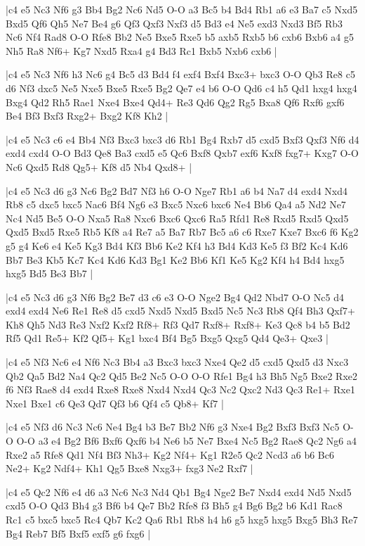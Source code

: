 \whitename{}
\blackname{}
\makegametitle
|c4 e5 Nc3 Nf6 g3 Bb4 Bg2 Nc6 Nd5 O-O a3 Bc5 b4 Bd4 Rb1 a6 e3 Ba7 c5 Nxd5 Bxd5 Qf6 Qh5 Ne7 Be4 g6 Qf3 Qxf3 Nxf3 d5 Bd3 e4 Ne5 exd3 Nxd3 Bf5 Rb3 Nc6 Nf4 Rad8 O-O Rfe8 Bb2 Ne5 Bxe5 Rxe5 b5 axb5 Rxb5 b6 cxb6 Bxb6 a4 g5 Nh5 Ra8 Nf6+ Kg7 Nxd5 Rxa4 g4 Bd3 Rc1 Bxb5 Nxb6 cxb6  |

\whitename{}
\blackname{}
\makegametitle
|c4 e5 Nc3 Nf6 h3 Nc6 g4 Bc5 d3 Bd4 f4 exf4 Bxf4 Bxc3+ bxc3 O-O Qb3 Re8 c5 d6 Nf3 dxc5 Ne5 Nxe5 Bxe5 Rxe5 Bg2 Qe7 e4 b6 O-O Qd6 c4 h5 Qd1 hxg4 hxg4 Bxg4 Qd2 Rh5 Rae1 Nxe4 Bxe4 Qd4+ Re3 Qd6 Qg2 Rg5 Bxa8 Qf6 Rxf6 gxf6 Be4 Bf3 Bxf3 Rxg2+ Bxg2 Kf8 Kh2  |

\whitename{}
\blackname{}
\makegametitle
|c4 e5 Nc3 c6 e4 Bb4 Nf3 Bxc3 bxc3 d6 Rb1 Bg4 Rxb7 d5 cxd5 Bxf3 Qxf3 Nf6 d4 exd4 cxd4 O-O Bd3 Qe8 Ba3 cxd5 e5 Qc6 Bxf8 Qxb7 exf6 Kxf8 fxg7+ Kxg7 O-O Nc6 Qxd5 Rd8 Qg5+ Kf8 d5 Nb4 Qxd8+  |

\whitename{}
\blackname{}
\makegametitle
|c4 e5 Nc3 d6 g3 Nc6 Bg2 Bd7 Nf3 h6 O-O Nge7 Rb1 a6 b4 Na7 d4 exd4 Nxd4 Rb8 c5 dxc5 bxc5 Nac6 Bf4 Ng6 e3 Bxc5 Nxc6 bxc6 Ne4 Bb6 Qa4 a5 Nd2 Ne7 Nc4 Nd5 Be5 O-O Nxa5 Ra8 Nxc6 Bxc6 Qxc6 Ra5 Rfd1 Re8 Rxd5 Rxd5 Qxd5 Qxd5 Bxd5 Rxe5 Rb5 Kf8 a4 Re7 a5 Ba7 Rb7 Bc5 a6 c6 Rxe7 Kxe7 Bxc6 f6 Kg2 g5 g4 Ke6 e4 Ke5 Kg3 Bd4 Kf3 Bb6 Ke2 Kf4 h3 Bd4 Kd3 Ke5 f3 Bf2 Kc4 Kd6 Bb7 Be3 Kb5 Kc7 Kc4 Kd6 Kd3 Bg1 Ke2 Bb6 Kf1 Ke5 Kg2 Kf4 h4 Bd4 hxg5 hxg5 Bd5 Be3 Bb7  |

\whitename{}
\blackname{}
\makegametitle
|c4 e5 Nc3 d6 g3 Nf6 Bg2 Be7 d3 c6 e3 O-O Nge2 Bg4 Qd2 Nbd7 O-O Nc5 d4 exd4 exd4 Ne6 Re1 Re8 d5 cxd5 Nxd5 Nxd5 Bxd5 Nc5 Nc3 Rb8 Qf4 Bh3 Qxf7+ Kh8 Qh5 Nd3 Re3 Nxf2 Kxf2 Rf8+ Rf3 Qd7 Rxf8+ Rxf8+ Ke3 Qc8 b4 b5 Bd2 Rf5 Qd1 Re5+ Kf2 Qf5+ Kg1 bxc4 Bf4 Bg5 Bxg5 Qxg5 Qd4 Qe3+ Qxe3  |

\whitename{}
\blackname{}
\makegametitle
|c4 e5 Nf3 Nc6 e4 Nf6 Nc3 Bb4 a3 Bxc3 bxc3 Nxe4 Qe2 d5 cxd5 Qxd5 d3 Nxc3 Qb2 Qa5 Bd2 Na4 Qc2 Qd5 Be2 Nc5 O-O O-O Rfe1 Bg4 h3 Bh5 Ng5 Bxe2 Rxe2 f6 Nf3 Rae8 d4 exd4 Rxe8 Rxe8 Nxd4 Nxd4 Qc3 Nc2 Qxc2 Nd3 Qc3 Re1+ Rxe1 Nxe1 Bxe1 c6 Qe3 Qd7 Qf3 b6 Qf4 c5 Qb8+ Kf7  |

\whitename{}
\blackname{}
\makegametitle
|c4 e5 Nf3 d6 Nc3 Nc6 Ne4 Bg4 b3 Be7 Bb2 Nf6 g3 Nxe4 Bg2 Bxf3 Bxf3 Nc5 O-O O-O a3 e4 Bg2 Bf6 Bxf6 Qxf6 b4 Ne6 b5 Ne7 Bxe4 Nc5 Bg2 Rae8 Qc2 Ng6 a4 Rxe2 a5 Rfe8 Qd1 Nf4 Bf3 Nh3+ Kg2 Nf4+ Kg1 R2e5 Qc2 Ncd3 a6 b6 Bc6 Ne2+ Kg2 Ndf4+ Kh1 Qg5 Bxe8 Nxg3+ fxg3 Ne2 Rxf7  |

\whitename{}
\blackname{}
\makegametitle
|c4 e5 Qc2 Nf6 e4 d6 a3 Nc6 Nc3 Nd4 Qb1 Bg4 Nge2 Be7 Nxd4 exd4 Nd5 Nxd5 cxd5 O-O Qd3 Bh4 g3 Bf6 b4 Qe7 Bb2 Rfe8 f3 Bh5 g4 Bg6 Bg2 b6 Kd1 Rac8 Rc1 c5 bxc5 bxc5 Rc4 Qb7 Kc2 Qa6 Rb1 Rb8 h4 h6 g5 hxg5 hxg5 Bxg5 Bh3 Re7 Bg4 Reb7 Bf5 Bxf5 exf5 g6 fxg6  |

